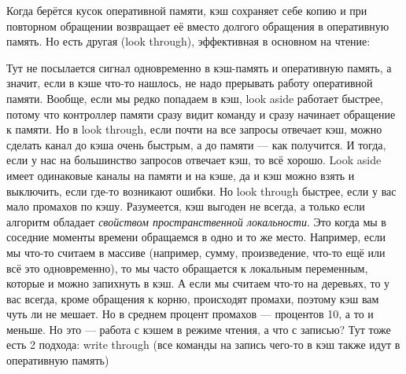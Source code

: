\documentclass{article}
\begin{document}
    Когда берётся кусок оперативной памяти, кэш сохраняет себе копию и при повторном обращении возвращает её вместо долгого обращения в оперативную память. Но есть другая (look through), эффективная в основном на чтение:
    \begin{center}
    \end{center}
    Тут не посылается сигнал одновременно в кэш-память и оперативную память, а значит, если в кэше что-то нашлось, не надо прерывать работу оперативной памяти. Вообще, если мы редко попадаем в кэш, look aside работает быстрее, потому что контроллер памяти сразу видит команду и сразу начинает обращение к памяти. Но в look through, если почти на все запросы отвечает кэш, можно сделать канал до кэша очень быстрым, а до памяти --- как получится. И тогда, если у нас на большинство запросов отвечает кэш, то всё хорошо. Look aside имеет одинаковые каналы на памяти и на кэше, да и кэш можно взять и выключить, если где-то возникают ошибки. Но look through быстрее, если у вас мало промахов по кэшу. Разумеется, кэш выгоден не всегда, а только если алгоритм обладает \textit{свойством пространственной локальности}. Это когда мы в соседние моменты времени обращаемся в одно и то же место. Например, если мы что-то считаем в массиве (например, сумму, произведение, что-то ещё или всё это одновременно), то мы часто обращается к локальным переменным, которые и можно запихнуть в кэш. А если мы считаем что-то на деревьях, то у вас всегда, кроме обращения к корню, происходят промахи, поэтому кэш вам чуть ли не мешает. Но в среднем процент промахов --- процентов 10, а то и меньше. Но это --- работа с кэшем в режиме чтения, а что с записью? Тут тоже есть 2 подхода: write through (все команды на запись чего-то в кэш также идут в оперативную память)
    \begin{center}
    \end{center}
\end{document}
